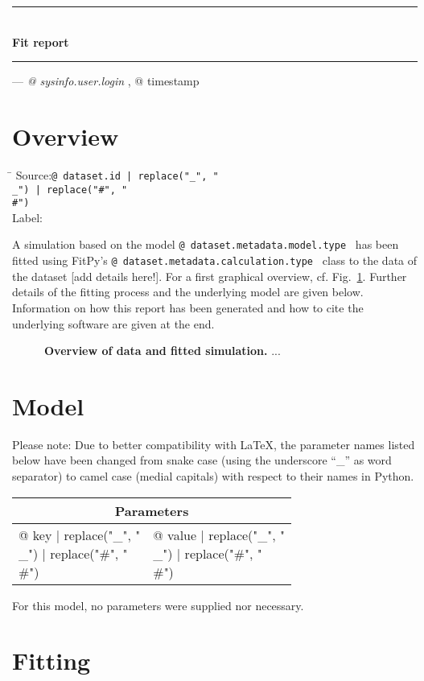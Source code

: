 

\rule[1ex]{\textwidth}{1pt}
\\[1em]
\textbf{\LARGE Fit report}
\\[1ex]
\rule{\textwidth}{1pt}

\hfill --- \textsl{{@ sysinfo.user.login }}, {@ timestamp }

\section{Overview}

\begin{tabbing}
\hspace*{1.5cm}\=\kill
Source:\>\texttt{{@ dataset.id | replace("_", "\\_") | replace("#", "\\#") }}
\\
Label:
\end{tabbing}

A simulation based on the model \texttt{{@ dataset.metadata.model.type }} has been fitted using FitPy's \texttt{{@ dataset.metadata.calculation.type }} class to the data of the dataset [add details here!]. For a first graphical overview, cf. Fig.~\ref{fig:overview}. Further details of the fitting process and the underlying model are given below. Information on how this report has been generated and how to cite the underlying software are given at the end.


\begin{figure}[h!]
\caption{\textbf{Overview of data and fitted simulation.} ...}
\label{fig:overview}
\end{figure}


\section{Model}

Please note: Due to better compatibility with \LaTeX{}, the parameter names listed below have been changed from snake case (using the underscore \enquote{\_} as word separator) to camel case (medial capitals) with respect to their names in Python.

\vspace*{1ex}
\begin{tabular}{ll}
\toprule
\multicolumn{2}{c}{\textbf{Parameters}}
\\
\midrule
{@ key | replace("_", "\\_") | replace("#", "\\#") } & {@ value | replace("_", "\\_") | replace("#", "\\#") }
\\
\bottomrule
\end{tabular}
\vspace*{1ex}
For this model, no parameters were supplied nor necessary.


\section{Fitting}


